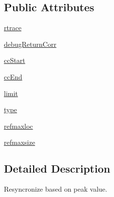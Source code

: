 \subsection*{Public Attributes}
\begin{DoxyCompactItemize}
\item 
\hyperlink{classsoftware_1_1chipwhisperer_1_1analyzer_1_1preprocessing_1_1ResyncPeakDetect_1_1ResyncPeakDetect_aa3ac6bab8c441f51c9d6fdf6798285fa}{rtrace}
\item 
\hyperlink{classsoftware_1_1chipwhisperer_1_1analyzer_1_1preprocessing_1_1ResyncPeakDetect_1_1ResyncPeakDetect_a127aa06ff6b6456aca9fe5423f696401}{debug\+Return\+Corr}
\item 
\hyperlink{classsoftware_1_1chipwhisperer_1_1analyzer_1_1preprocessing_1_1ResyncPeakDetect_1_1ResyncPeakDetect_a6ed3a041c3a1fd577fa268931788654b}{cc\+Start}
\item 
\hyperlink{classsoftware_1_1chipwhisperer_1_1analyzer_1_1preprocessing_1_1ResyncPeakDetect_1_1ResyncPeakDetect_a7c07c2c7e94e22ae7586b3042ea9af39}{cc\+End}
\item 
\hyperlink{classsoftware_1_1chipwhisperer_1_1analyzer_1_1preprocessing_1_1ResyncPeakDetect_1_1ResyncPeakDetect_a09cc977907f6f61b88b83cd813ca86b1}{limit}
\item 
\hyperlink{classsoftware_1_1chipwhisperer_1_1analyzer_1_1preprocessing_1_1ResyncPeakDetect_1_1ResyncPeakDetect_a3b7dd046990d2201be9e6e2790a18d5f}{type}
\item 
\hyperlink{classsoftware_1_1chipwhisperer_1_1analyzer_1_1preprocessing_1_1ResyncPeakDetect_1_1ResyncPeakDetect_aea34ee07b3169ccaf0939de3cfff60e5}{refmaxloc}
\item 
\hyperlink{classsoftware_1_1chipwhisperer_1_1analyzer_1_1preprocessing_1_1ResyncPeakDetect_1_1ResyncPeakDetect_a277a8c8b16aed8a158a352e249019e29}{refmaxsize}
\end{DoxyCompactItemize}


\subsection{Detailed Description}
\begin{DoxyVerb}Resyncronize based on peak value.
\end{DoxyVerb}
 

